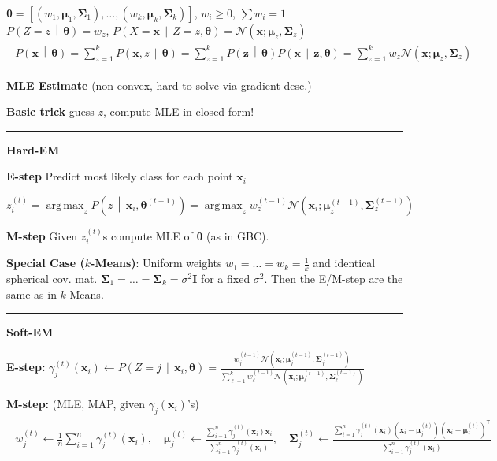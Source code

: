 \documentclass[a4paper,8pt,landscape]{extarticle}
\newcommand{\sep}{\vspace{5pt}\noindent\hrule\vspace{5pt}}
\newcommand{\cN}{\mathcal{N}}
\newcommand{\cProb}[2]{P\left( #1 \,\middle|\, #2 \right)}
\newcommand*{\T}{\mathsf{T}}
\DeclareMathOperator*{\argmax}{arg\,max}
\newcommand{\mat}[1]{\mathbf{#1}}
\renewcommand{\vec}[1]{\mathbf{#1}}
\newcommand{\vx}{\vec{x}}
\newcommand{\vz}{\vec{z}}
\newcommand{\vmu}{\boldsymbol{\mu}}
\newcommand{\vtheta}{\boldsymbol{\theta}}
\newcommand{\MI}{\mat{I}}
\newcommand{\MSigma}{\mat{\Sigma}}
\begin{document}
\begin{multicols*}{3}
$\vtheta=[(w_1,\vmu_1,\MSigma_1),\ldots,(w_k,\vmu_k,\MSigma_k)]$, $w_i\geq0$,
$\sum w_i=1$\\
$\cProb{Z=z}{\vtheta}=w_z$, \quad
$\cProb{X=\vx}{Z=z,\vtheta}=\cN(\vx;\vmu_z,\MSigma_z)$
\begin{gather*}
\begin{align*}
\cProb{\vx}{\vtheta}
=\textstyle\sum_{z=1}^k \cProb{\vx,z}{\vtheta}
=\textstyle\sum_{z=1}^k \cProb{\vz}{\vtheta}\cProb{\vx}{\vz,\vtheta}
=\textstyle\sum_{z=1}^k w_z\cN(\vx;\vmu_z,\MSigma_z)
\end{align*}
\end{gather*}

\textbf{MLE Estimate} (non-convex, hard to solve via gradient desc.)

\textbf{Basic trick} guess $z$, compute MLE in closed form!

\sep

\textbf{Hard-EM}

\textbf{E-step} Predict most likely class for each point $\vx_i$

$z_i^{(t)}=\argmax_z \cProb{z}{\vx_i,\vtheta^{(t-1)}}
=\argmax_z w_z^{(t-1)}\cN(\vx_i;\vmu_{z}^{(t-1)},\MSigma_z^{(t-1)})$

\textbf{M-step} Given $z_i^{(t)}$s compute MLE of $\vtheta$ (as in GBC).

\textbf{Special Case ($k$-Means)}: Uniform weights
$w_1=\ldots=w_k=\frac{1}{k}$ and identical spherical cov. mat.
$\MSigma_1=\ldots=\MSigma_k=\sigma^2\MI$ for a fixed $\sigma^2$. Then the
E/M-step are the same as in $k$-Means.

\sep

\textbf{Soft-EM}

\textbf{E-step:}
$\gamma_j^{(t)}(\vx_i)\leftarrow
\cProb{Z=j}{\vx_i,\vtheta}=
\frac{w_j^{(t-1)}
\cN(\vx_i;\vmu_j^{(t-1)},\MSigma_j^{(t-1)})}{
\sum_{\ell=1}^{k} w_\ell^{(t-1)}
\cN(\vx_i;\vmu_\ell^{(t-1)},\MSigma_\ell^{(t-1)}) }$


\textbf{M-step:} (MLE, MAP, given $\gamma_j(\vx_i)$'s)
\begin{gather*}
\begin{align*}
w_j^{(t)}\leftarrow\frac{1}{n}\sum_{i=1}^{n}\gamma_j^{(t)}(\vx_i),\quad
\vmu_j^{(t)}\leftarrow \frac{\sum_{i=1}^n \gamma_j^{(t)}(\vx_i)\vx_i}{
\sum_{i=1}^n \gamma_j^{(t)}(\vx_i)},\quad
\MSigma_j^{(t)}\leftarrow \frac{\sum_{i=1}^n \gamma_j^{(t)}(\vx_i)
(\vx_i-\vmu_j^{(t)})(\vx_i-\vmu_j^{(t)})^\T}{
\sum_{i=1}^n \gamma_j^{(t)}(\vx_i)}
\end{align*}
\end{gather*}


\end{multicols*}
\end{document}

